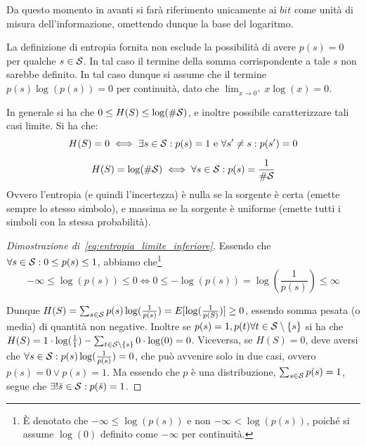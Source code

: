 Da questo momento in avanti si farà riferimento unicamente ai \(bit\) come unità di misura dell'informazione, omettendo dunque la base del logaritmo.

\begin{note}{}
  La definizione di entropia fornita non esclude la possibilità di avere \(p(s) = 0\) per qualche \(s \in \mathcal{S}\).
  In tal caso il termine della somma corrispondente a tale \(s\) non sarebbe definito.
  In tal caso dunque si assume che il termine \(p(s)\log(p(s)) = 0\) per continuità, dato che \(\lim_{x \to 0^+} x \log(x) = 0\).
\end{note}

In generale si ha che \(0 \leq H(S) \leq \log(\#\mathcal{S})\), e inoltre possibile caratterizzare tali casi limite. Si ha che:
\begin{equation}\label{eq:entropia_limite_inferiore}
    H(S) = 0 \iff \exists s \in \mathcal{S}: p(s) = 1 \text{ e } \forall s' \neq s: p(s') = 0
  \end{equation}

\begin{equation}\label{eq:entropia_limite_superiore}
  H(S) = \log(\#\mathcal{S}) \iff \forall s \in \mathcal{S}: p(s) = \frac{1}{\#\mathcal{S}}
\end{equation}
Ovvero l'entropia (e quindi l'incertezza) è nulla se la sorgente è certa (emette sempre lo stesso simbolo), e massima se la sorgente è uniforme (emette tutti i simboli con la stessa probabilità).

\begin{proof}[Dimostrazione di~\ref{eq:entropia_limite_inferiore}]
  Essendo che \(\forall s \in \mathcal{S}: 0\leq p(s) \leq 1\), abbiamo che\footnote{È denotato che \(-\infty \leq \log(p(s))\) e non \(-\infty < \log(p(s))\), poiché si assume \(\log(0)\) definito come \(-\infty\) per continuità.}
  \[-\infty \leq \log(p(s)) \leq 0 \iff  0 \leq -\log(p(s)) = \log(\frac{1}{p(s)}) \leq \infty\]

  Dunque \(H(S) = \sum_{s \in \mathcal{S}} p(s) \log(\frac{1}{p(s)}) = E[\log(\frac{1}{p(S)})] \geq 0\), essendo somma pesata (o media) di quantità non negative.
  Inoltre se \(p(s) = 1, p(t) \forall t \in \SCal \setminus \set{s}\) si ha che \(H(S) = 1 \cdot \log(\frac{1}{1}) - \sum_{t \in \SCal \setminus \set{s}} 0 \cdot \log(0) = 0\).
  Viceversa, se \(H(S) = 0\), deve aversi che \(\forall s \in \mathcal{S}: p(s) \log(\frac{1}{p(s)}) = 0\), che può avvenire solo in due casi, ovvero \(p(s) = 0 \lor p(s) = 1\).
  Ma essendo che \(p\) è una distribuzione, \(\sum_{s \in \mathcal{S}} p(s) = 1\), segue che  \(\exists!\bar{s} \in \mathcal{S}: p(\bar{s}) = 1\).
\end{proof}

